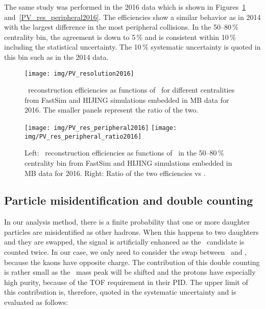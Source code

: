 The same study was performed in the 2016 data which is shown in Figures~\ref{PV_resolution2016} and~\ref{PV_res_peripheral2016}\@. The efficiencies show a similar behavior as in 2014 with the largest difference in the most peripheral collisions. In the 50--80$\,\%$ centrality bin, the agreement is down to 5$\,\%$ and is consistent within 10$\,\%$ including the statistical uncertainty. The 10$\,\%$ systematic uncertainty is quoted in this bin such as in the 2014 data.

\begin{figure}[!htb]
\centering
\texttt{[image: img/PV\_resolution2016]}

\caption[\Lambdac\ reconstruction efficiencies from FastSim and HIJING simulations embedded in MB data for 2016.]{\label{PV_resolution2016} \Lambdac\ reconstruction efficiencies as functions of \pt\ for different centralities from FastSim and HIJING simulations embedded in MB data for 2016. The smaller panels represent the ratio of the two.}
\end{figure}

\begin{figure}[!htb]
\centering
\texttt{[image: img/PV\_res\_peripheral2016]}
\texttt{[image: img/PV\_res\_peripheral\_ratio2016]}
\caption[\Lambdac\ reconstruction efficiencies from FastSim and HIJING simulations embedded in MB data for 2016 and ratio of the two efficiencies.]{\label{PV_peripheral2016} Left: \Lambdac\ reconstruction efficiencies as functions of \pt\ in the 50--80\,\% centrality bin from FastSim and HIJING simulations embedded in MB data for 2016. Right: Ratio of the two efficiencies vs \pt.}
\end{figure}


\subsection{Particle misidentification and double counting}
In our analysis method, there is a finite probability that one or more daughter particles are misidentified as other hadrons. When this happens to two daughters and they are swapped, the signal is artificially enhanced as the \Lambdac\ candidate is counted twice. In our case, we only need to consider the swap between \ppm\ and \pipm, because the kaons have opposite charge. The contribution of this double counting is rather small as the \Lambdac\ mass peak will be shifted and the protons have especially high purity, because of the TOF requirement in their PID\@. The upper limit of this contribution is, therefore, quoted in the systematic uncertainty and is evaluated as follows:

